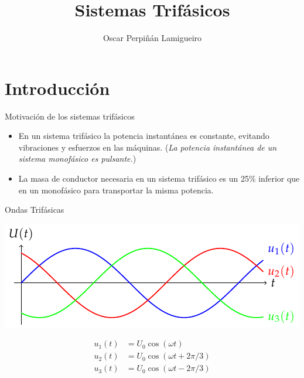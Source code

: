\documentclass[xcolor={usenames,svgnames,dvipsnames}]{beamer}
\author{Oscar Perpiñán Lamigueiro}
\date{}
\title{Sistemas Trifásicos}
\begin{document}
\maketitle

\section{Introducción}
\label{sec:orgf3183bf}
\begin{frame}[label={sec:org55aba95}]{Motivación de los sistemas trifásicos}
\begin{itemize}
\item En un sistema trifásico la potencia instantánea es constante, evitando vibraciones y esfuerzos en las máquinas. (\emph{La potencia instantánea de un sistema monofásico es pulsante.})

\item La masa de conductor necesaria en un sistema trifásico es un 25\% inferior que en un monofásico para transportar la misma potencia.
\end{itemize}
\end{frame}

\begin{frame}[label={sec:orgf29e423}]{Ondas Trifásicas}
\begin{center}
\includegraphics[width=.9\linewidth]{figs/TensionesTrifasica.pdf}
\end{center}

\begin{align*}
  u_1(t) &= U_0 \cos(\omega t)\\
  u_2(t) &= U_0 \cos(\omega t + 2\pi/3)\\
  u_3(t) &= U_0 \cos(\omega t - 2\pi/3)
\end{align*}
\end{frame}
\end{document}
